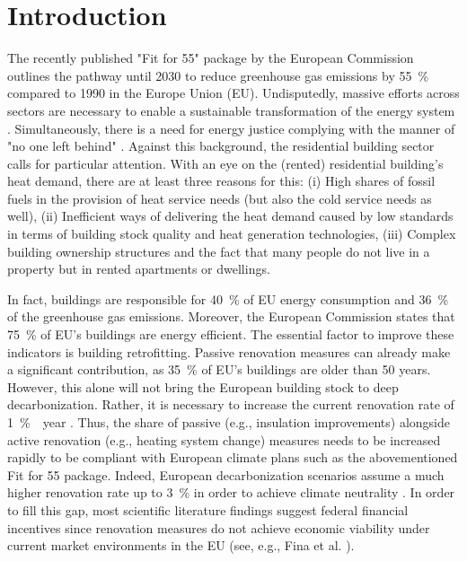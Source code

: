 \section{Introduction}
The recently published "Fit for 55" package \cite{european_commission_european_2019} by the European Commission outlines the pathway until 2030 to reduce greenhouse gas emissions by \SI{55}{\%} compared to 1990 in the Europe Union (EU). Undisputedly, massive efforts across sectors are necessary to enable a sustainable transformation of the energy system \cite{korkmaz2020comparison}. Simultaneously, there is a need for energy justice complying with the manner of "no one left behind" \cite{sovacool2019decarbonization}. Against this background, the residential building sector calls for particular attention. With an eye on the (rented) residential building's heat demand, there are at least three reasons for this: (i) High shares of fossil fuels in the provision of heat service needs (but also the cold service needs as well), (ii) Inefficient ways of delivering the heat demand caused by low standards in terms of building stock quality and heat generation technologies, (iii) Complex building ownership structures and the fact that many people do not live in a property but in rented apartments or dwellings.\vspace{0.5cm}

In fact, buildings are responsible for \SI{40}{\%} of EU energy consumption and \SI{36}{\%} of the greenhouse gas emissions. Moreover, the European Commission states that \SI{75}{\%} of EU's buildings are energy efficient. The essential factor to improve these indicators is building retrofitting. Passive renovation measures can already make a significant contribution, as \SI{35}{\%} of EU's buildings are older than \SI{50}{} years. However, this alone will not bring the European building stock to deep decarbonization. Rather, it is necessary to increase the current renovation rate of \SI{1}{\% \per year} \cite{eurocombuildings2021}. Thus, the share of passive (e.g., insulation improvements) alongside active renovation (e.g., heating system change) measures needs to be increased rapidly to be compliant with European climate plans such as the abovementioned Fit for 55 package. Indeed, European decarbonization scenarios assume a much higher renovation rate up to \SI{3}{\%} in order to achieve climate neutrality \cite{korkmaz2020comparison}. In order to fill this gap, most scientific literature findings suggest federal financial incentives since renovation measures do not achieve economic viability under current market environments in the EU (see, e.g., Fina et al. \cite{fina2019profitability}).\vspace{0.5cm}

